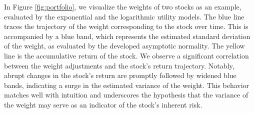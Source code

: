 \documentclass[aos]{imsart}
\numberwithin{equation}{section}
\theoremstyle{plain}
\begin{document}
In Figure \ref{fig:portfolio}, we visualize the weights of two stocks as an example, evaluated by the exponential and the logarithmic utility models.
The blue line traces the trajectory of the weight corresponding to the stock over time. This is accompanied by a blue band, which represents the estimated standard deviation of the weight, as evaluated by the developed asymptotic normality. The yellow line is the accumulative return of the stock. 
We observe a significant correlation between the weight adjustments and the stock's return trajectory.
Notably, abrupt changes in the stock's return are promptly followed by widened blue bands, indicating a surge in the estimated variance of the weight.
This behavior matches well with intuition and underscores the hypothesis that the variance of the weight may serve as an indicator of the stock's inherent risk.
\end{document}
